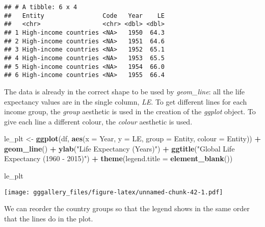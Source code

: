 \documentclass[]{book}
\newenvironment{Shaded}{\begin{snugshade}}{\end{snugshade}}
\newcommand{\DataTypeTok}[1]{\textcolor[rgb]{0.13,0.29,0.53}{#1}}
\newcommand{\KeywordTok}[1]{\textcolor[rgb]{0.13,0.29,0.53}{\textbf{#1}}}
\newcommand{\NormalTok}[1]{#1}
\newcommand{\OperatorTok}[1]{\textcolor[rgb]{0.81,0.36,0.00}{\textbf{#1}}}
\newcommand{\StringTok}[1]{\textcolor[rgb]{0.31,0.60,0.02}{#1}}
\begin{document}
\begin{verbatim}
## # A tibble: 6 x 4
##   Entity                Code   Year    LE
##   <chr>                 <chr> <dbl> <dbl>
## 1 High-income countries <NA>   1950  64.3
## 2 High-income countries <NA>   1951  64.6
## 3 High-income countries <NA>   1952  65.1
## 4 High-income countries <NA>   1953  65.5
## 5 High-income countries <NA>   1954  66.0
## 6 High-income countries <NA>   1955  66.4
\end{verbatim}

The data is already in the correct shape to be used by \emph{geom\_line}: all the life expectancy values are in the single column, \emph{LE}.
To get different lines for each income group, the \emph{group} aesthetic is used in the creation of the \emph{ggplot} object. To give each line a different colour, the \emph{colour} aesthetic is used.

\begin{Shaded}
\begin{Highlighting}[]
\NormalTok{le_plt <-}\StringTok{ }\KeywordTok{ggplot}\NormalTok{(df, }\KeywordTok{aes}\NormalTok{(}\DataTypeTok{x =}\NormalTok{ Year, }\DataTypeTok{y =}\NormalTok{ LE, }\DataTypeTok{group =}\NormalTok{ Entity, }\DataTypeTok{colour =}\NormalTok{ Entity)) }\OperatorTok{+}\StringTok{ }
\StringTok{  }\KeywordTok{geom_line}\NormalTok{() }\OperatorTok{+}\StringTok{ }
\StringTok{  }\KeywordTok{ylab}\NormalTok{(}\StringTok{"Life Expectancy (Years)"}\NormalTok{) }\OperatorTok{+}\StringTok{ }
\StringTok{  }\KeywordTok{ggtitle}\NormalTok{(}\StringTok{"Global Life Expectancy (1960 - 2015)"}\NormalTok{) }\OperatorTok{+}
\StringTok{  }\KeywordTok{theme}\NormalTok{(}\DataTypeTok{legend.title =} \KeywordTok{element_blank}\NormalTok{())}

\NormalTok{le_plt}
\end{Highlighting}
\end{Shaded}

\texttt{[image: gggallery\_files/figure-latex/unnamed-chunk-42-1.pdf]}

We can reorder the country groups so that the legend shows in the same order that the lines do in the plot.
\end{document}
